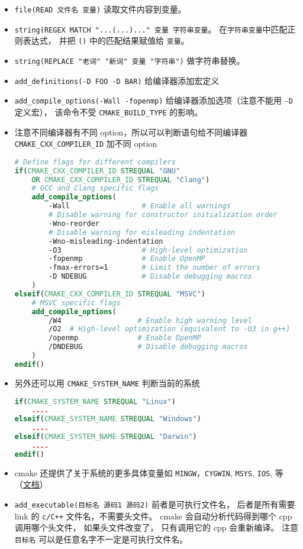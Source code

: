 \begin{itemize}
\item \verb`file(READ 文件名 变量)` 读取文件内容到变量。
\item \verb`string(REGEX MATCH "...(...)..." 变量 字符串变量`。 在\verb`字符串变量`中匹配正则表达式， 并把 \verb`()` 中的匹配结果赋值给 \verb`变量`。
\item \verb`string(REPLACE "老词" "新词" 变量 "字符串")` 做字符串替换。
\item \verb`add_definitions(-D FOO -D BAR)` 给编译器添加宏定义
\item \verb`add_compile_options(-Wall -fopenmp)` 给编译器添加选项（注意不能用 \verb`-D` 定义宏）， 该命令不受 \verb`CMAKE_BUILD_TYPE` 的影响。
\item 注意不同编译器有不同 option，所以可以判断语句给不同编译器 \verb`CMAKE_CXX_COMPILER_ID` 加不同 option
\begin{lstlisting}[language=cmake]
# Define flags for different compilers
if(CMAKE_CXX_COMPILER_ID STREQUAL "GNU"
    OR CMAKE_CXX_COMPILER_ID STREQUAL "Clang")
    # GCC and Clang specific flags
    add_compile_options(
        -Wall                 # Enable all warnings
        # Disable warning for constructor initialization order
        -Wno-reorder
        # Disable warning for misleading indentation
        -Wno-misleading-indentation
        -O3                   # High-level optimization
        -fopenmp              # Enable OpenMP
        -fmax-errors=1        # Limit the number of errors
        -D NDEBUG             # Disable debugging macros
    )
elseif(CMAKE_CXX_COMPILER_ID STREQUAL "MSVC")
    # MSVC specific flags
    add_compile_options(
        /W4                  # Enable high warning level
        /O2  # High-level optimization (equivalent to -O3 in g++)
        /openmp              # Enable OpenMP
        /DNDEBUG             # Disable debugging macros
    )
endif()
\end{lstlisting}
\item 另外还可以用 \verb`CMAKE_SYSTEM_NAME` 判断当前的系统
\begin{lstlisting}[language=cmake]
if(CMAKE_SYSTEM_NAME STREQUAL "Linux")
    ....
elseif(CMAKE_SYSTEM_NAME STREQUAL "Windows")
    ....
elseif(CMAKE_SYSTEM_NAME STREQUAL "Darwin")
    ....
endif()
\end{lstlisting}
\item cmake 还提供了关于系统的更多具体变量如 \verb`MINGW`，\verb`CYGWIN`, \verb`MSYS`, \verb`IOS`, 等（\href{https://cmake.org/cmake/help/latest/manual/cmake-variables.7.html}{文档}）
\item \verb`add_executable(目标名 源码1 源码2)` 前者是可执行文件名， 后者是所有需要 link 的 \verb`c/C++` 文件名，不需要头文件。 cmake 会自动分析代码得到哪个 cpp 调用哪个头文件， 如果头文件改变了， 只有调用它的 cpp 会重新编译。 注意 \verb`目标名` 可以是任意名字不一定是可执行文件名。

\end{itemize}
